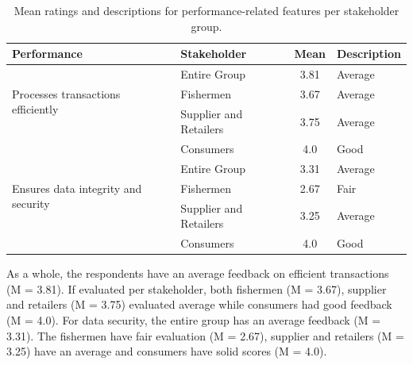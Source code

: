 \vspace{1cm}
\begin{table}[h]
	\centering
	\begin{tabular}{|l|l|c|l|}
		\hline
		\textbf{Performance} & \textbf{Stakeholder} & \textbf{Mean} & \textbf{Description} \\ \hline
		\multirow{3}{*}{Processes transactions efficiently} 
		& Entire Group & 3.81 & Average \\ \cline{2-4}
		& Fishermen & 3.67 & Average \\ \cline{2-4}
		& Supplier and Retailers & 3.75 & Average \\ \cline{2-4}
		& Consumers & 4.0 & Good \\ \hline
		
		\multirow{3}{*}{Ensures data integrity and security} 
		& Entire Group & 3.31 & Average \\ \cline{2-4}
		& Fishermen & 2.67 & Fair \\ \cline{2-4}
		& Supplier and Retailers & 3.25 & Average \\ \cline{2-4}
		& Consumers & 4.0 & Good \\ \hline
		
	\end{tabular}
	\caption{Mean ratings and descriptions for performance-related features per stakeholder group.}
	\label{tab:performance}
\end{table}

As a whole, the respondents have an average feedback on efficient transactions (M = 3.81). If evaluated per stakeholder, both fishermen (M = 3.67), supplier and retailers (M = 3.75) evaluated average while consumers had good feedback (M = 4.0). For data security, the entire group has an average feedback (M = 3.31). The fishermen have fair evaluation (M = 2.67), supplier and retailers (M = 3.25) have an average and consumers have solid scores (M = 4.0).




